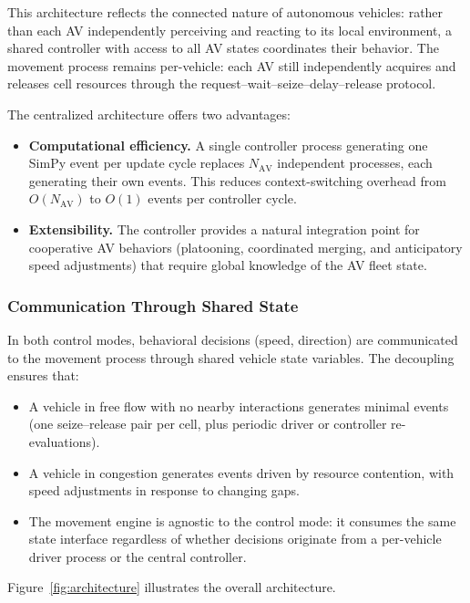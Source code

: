 \documentclass[review,authoryear]{elsarticle}
\begin{document}
This architecture reflects the connected nature of autonomous vehicles: rather than each AV independently perceiving and reacting to its local environment, a shared controller with access to all AV states coordinates their behavior. The movement process remains per-vehicle: each AV still independently acquires and releases cell resources through the request--wait--seize--delay--release protocol.

The centralized architecture offers two advantages:
\begin{itemize}
    \item \textbf{Computational efficiency.} A single controller process generating one SimPy event per update cycle replaces $N_{\text{AV}}$ independent processes, each generating their own events. This reduces context-switching overhead from $O(N_{\text{AV}})$ to $O(1)$ events per controller cycle.
    \item \textbf{Extensibility.} The controller provides a natural integration point for cooperative AV behaviors (platooning, coordinated merging, and anticipatory speed adjustments) that require global knowledge of the AV fleet state.
\end{itemize}

\subsubsection{Communication Through Shared State}

In both control modes, behavioral decisions (speed, direction) are communicated to the movement process through shared vehicle state variables. The decoupling ensures that:

\begin{itemize}
    \item A vehicle in free flow with no nearby interactions generates minimal events (one seize--release pair per cell, plus periodic driver or controller re-evaluations).
    \item A vehicle in congestion generates events driven by resource contention, with speed adjustments in response to changing gaps.
    \item The movement engine is agnostic to the control mode: it consumes the same state interface regardless of whether decisions originate from a per-vehicle driver process or the central controller.
\end{itemize}

Figure~\ref{fig:architecture} illustrates the overall architecture.
\end{document}
